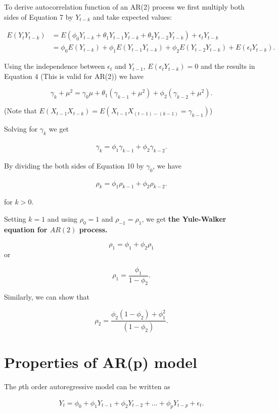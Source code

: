 \documentclass[
  11pt,
  a4paper,
]{report}
\begin{document}
To derive autocorrelation function of an AR(2) process we first multiply
both sides of Equation 7 by \(Y_{t-k}\) and take expected values:

\begin{align}
E(Y_tY_{t-k}) &= E(\phi_0Y_{t-k}+\theta_1Y_{t-1}Y_{t-k}+\theta_2Y_{t-2}Y_{t-k})+\epsilon_tY_{t-k} \\
&= \phi_0 E(Y_{t-k})+\phi_{1}E(Y_{t-1}Y_{t-k}) + \phi_2 E(Y_{t-2} Y_{t-k}) + E(\epsilon_tY_{t-k}).
\end{align}

Using the independence between \(\epsilon_t\) and \(Y_{t-1}\),
\(E(\epsilon_t Y_{t-k})=0\) and the results in Equation 4 (This is valid
for AR(2)) we have

\[\gamma_k + \mu^2 = \gamma_0 \mu + \theta_1 (\gamma_{k-1}+\mu^2)+\phi_2 (\gamma_{k-2}+\mu^2).\]

(Note that \(E(X_{t-1}X_{t-k})=E(X_{t-1}X_{(t-1)-(k-1)}=\gamma_{k-1})\))

Solving for \(\gamma_k\) we get

\begin{align}
 \gamma_k=\phi_1\gamma_{k-1}+\phi_2\gamma_{k-2}.
\end{align}

By dividing the both sides of Equation 10 by \(\gamma_0\), we have

\begin{align}
 \rho_k=\phi_1\rho_{k-1}+\phi_2\rho_{k-2}.
\end{align}

for \(k>0\).

Setting \(k=1\) and using \(\rho_0=1\) and \(\rho_{-1}=\rho_1\), we get
\textbf{the Yule-Walker equation for \(AR(2)\) process.}

\[\rho_1=\phi_1+\phi_2 \rho_1\] or

\[\rho_1 = \frac{\phi_1}{1-\phi_2}.\]

Similarly, we can show that

\[\rho_2 = \frac{\phi_2(1-\phi_2)+\phi_1^2}{(1-\phi_2)}.\]

\section{Properties of AR(p) model}\label{properties-of-arp-model}

The \(p\)th order autoregressive model can be written as

\begin{align}
Y_t = \phi_0 + \phi_1Y_{t-1}+\phi_2 Y_{t-2}+ ... + \phi_p Y_{t-p}+\epsilon_t.
\end{align}
\end{document}
